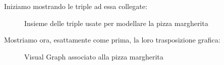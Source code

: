 \documentclass[12pt]{article}
\begin{document}
    \newline
    Iniziamo mostrando le triple ad essa collegate:
    \begin{figure}[H]
        \caption{Insieme delle triple usate per modellare la pizza margherita}
    \end{figure}
    Mostriamo ora, esattamente come prima, la loro trasposizione grafica:
    \begin{figure}[H]
        \caption{Visual Graph associato alla pizza margherita}
    \end{figure}
\end{document}
